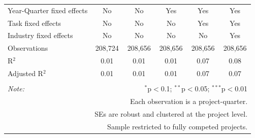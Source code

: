 \documentclass[
]{article}
\begin{document}
\begin{table}[H]
\begin{tabular}{@{\extracolsep{-2pt}}lccccc}
Year-Quarter fixed effects & No & No & Yes & Yes & Yes \\ 
Task fixed effects & No & No & No & Yes & Yes \\ 
Industry fixed effects & No & No & No & No & Yes \\ 
Observations & 208,724 & 208,656 & 208,656 & 208,656 & 208,656 \\ 
R$^{2}$ & 0.01 & 0.01 & 0.01 & 0.07 & 0.08 \\ 
Adjusted R$^{2}$ & 0.01 & 0.01 & 0.01 & 0.07 & 0.07 \\ 
\hline 
\hline \\[-1.8ex] 
\textit{Note:}  & \multicolumn{5}{r}{$^{*}$p$<$0.1; $^{**}$p$<$0.05; $^{***}$p$<$0.01} \\ 
 & \multicolumn{5}{r}{Each observation is a project-quarter.} \\ 
 & \multicolumn{5}{r}{SEs are robust and clustered at the project level.} \\ 
 & \multicolumn{5}{r}{Sample restricted to fully competed projects.} \\ 
\end{tabular} 
\end{table}
\end{document}
